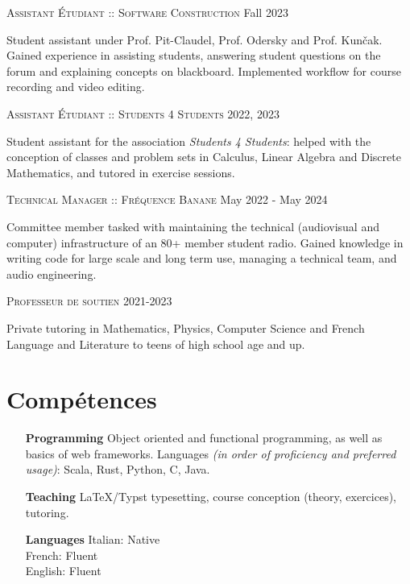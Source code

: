 \documentclass[11pt]{article}
\renewcommand{\line}[2]{{\vspace{4pt} \large \noindent\textsc{#1} \hfill #2}\vspace{4pt}}
\begin{document}
  \line{Assistant Étudiant :: Software Construction}{Fall 2023}

  Student assistant under Prof. Pit-Claudel, Prof. Odersky and Prof. Kunčak. Gained experience in assisting students, answering student questions on the forum and explaining concepts on blackboard. Implemented workflow for course recording and video editing.

  \line{Assistant Étudiant :: Students 4 Students}{2022, 2023}

  Student assistant for the association \textit{Students 4 Students}: helped with the conception of classes and problem sets in Calculus, Linear Algebra and Discrete Mathematics, and tutored in exercise sessions.

  \line{Technical Manager :: Fréquence Banane}{May 2022 - May 2024}

  Committee member tasked with maintaining the technical (audiovisual and computer) infrastructure of an 80+ member student radio. Gained knowledge in writing code for large scale and long term use, managing a technical team, and audio engineering.

  \line{Professeur de soutien}{2021-2023}

  Private tutoring in Mathematics, Physics, Computer Science and French Language and Literature to teens of high school age and up.

  \section*{Compétences}
  
  \begin{adjustwidth}{1in}{}
    \begin{itemize}
      \item[\textbf{Programming}] Object oriented and functional programming, as well as basics of web frameworks. Languages \textit{(in order of proficiency and preferred usage)}: Scala, Rust, Python, C, Java. 
      \item[\textbf{Teaching}] LaTeX/Typst typesetting, course conception (theory, exercices), tutoring.
      \item[\textbf{Languages}] Italian: Native \\ French: Fluent \\ English: Fluent
    \end{itemize}
  \end{adjustwidth}
\end{document}

